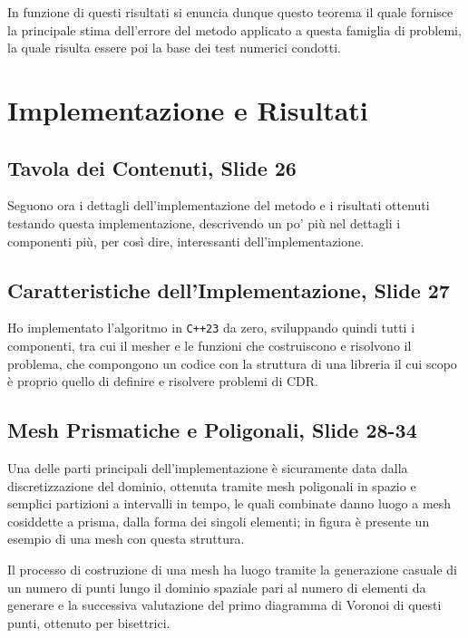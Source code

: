 \documentclass[12pt]{article}
\begin{document}
    In funzione di questi risultati si enuncia dunque questo teorema il quale fornisce la principale stima dell'errore del metodo applicato a questa famiglia di problemi, la quale risulta essere poi la base dei test numerici condotti.

    \newpage
    \section{Implementazione e Risultati}

    \subsection{Tavola dei Contenuti, Slide 26}

    Seguono ora i dettagli dell'implementazione del metodo e i risultati ottenuti testando questa implementazione, descrivendo un po' più nel dettagli i componenti più, per così dire, interessanti dell'implementazione.

    \subsection{Caratteristiche dell'Implementazione, Slide 27}

    Ho implementato l'algoritmo in \lstinline{C++23} da zero, sviluppando quindi tutti i componenti, tra cui il mesher e le funzioni che costruiscono e risolvono il problema, che compongono un codice con la struttura di una libreria il cui scopo è proprio quello di definire e risolvere problemi di CDR.

    \subsection{Mesh Prismatiche e Poligonali, Slide 28-34}

    Una delle parti principali dell'implementazione è sicuramente data dalla discretizzazione del dominio, ottenuta tramite mesh poligonali in spazio e semplici partizioni a intervalli in tempo, le quali combinate danno luogo a mesh cosiddette a prisma, dalla forma dei singoli elementi; in figura è presente un esempio di una mesh con questa struttura.

    Il processo di costruzione di una mesh ha luogo tramite la generazione casuale di un numero di punti lungo il dominio spaziale pari al numero di elementi da generare e la successiva valutazione del primo diagramma di Voronoi di questi punti, ottenuto per bisettrici.
\end{document}
